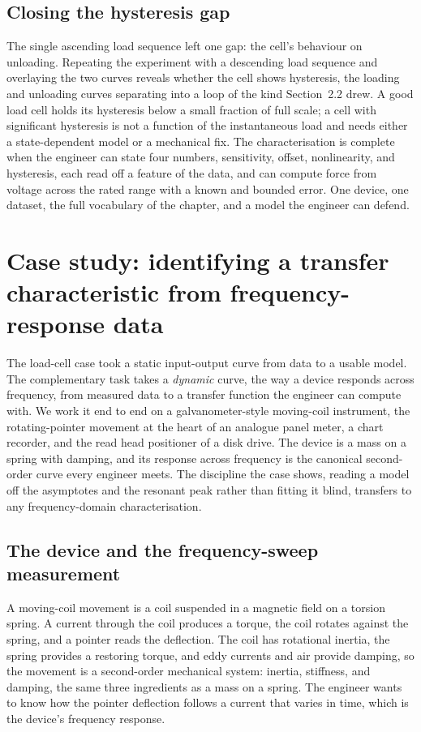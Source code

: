 \subsection{Closing the hysteresis gap}

The single ascending load sequence left one gap: the cell's behaviour
on unloading. Repeating the experiment with a descending load
sequence and overlaying the two curves reveals whether the cell
shows hysteresis, the loading and unloading curves separating into a
loop of the kind Section~2.2 drew. A good load cell holds its
hysteresis below a small fraction of full scale; a cell with
significant hysteresis is not a function of the instantaneous load
and needs either a state-dependent model or a mechanical fix. The
characterisation is complete when the engineer can state four
numbers, sensitivity, offset, nonlinearity, and hysteresis, each
read off a feature of the data, and can compute force from voltage
across the rated range with a known and bounded error. One device,
one dataset, the full vocabulary of the chapter, and a model the
engineer can defend.

\section{Case study: identifying a transfer characteristic from
frequency-response data}

The load-cell case took a static input-output curve from data to a
usable model. The complementary task takes a \emph{dynamic} curve, the
way a device responds across frequency, from measured data to a
transfer function the engineer can compute with. We work it end to end
on a galvanometer-style moving-coil instrument, the rotating-pointer
movement at the heart of an analogue panel meter, a chart recorder, and
the read head positioner of a disk drive. The device is a mass on a
spring with damping, and its response across frequency is the canonical
second-order curve every engineer meets. The discipline the case shows,
reading a model off the asymptotes and the resonant peak rather than
fitting it blind, transfers to any frequency-domain characterisation.

\subsection{The device and the frequency-sweep measurement}

A moving-coil movement is a coil suspended in a magnetic field on a
torsion spring. A current through the coil produces a torque, the coil
rotates against the spring, and a pointer reads the deflection. The
coil has rotational inertia, the spring provides a restoring torque,
and eddy currents and air provide damping, so the movement is a
second-order mechanical system: inertia, stiffness, and damping, the
same three ingredients as a mass on a spring. The engineer wants to
know how the pointer deflection follows a current that varies in time,
which is the device's frequency response.

